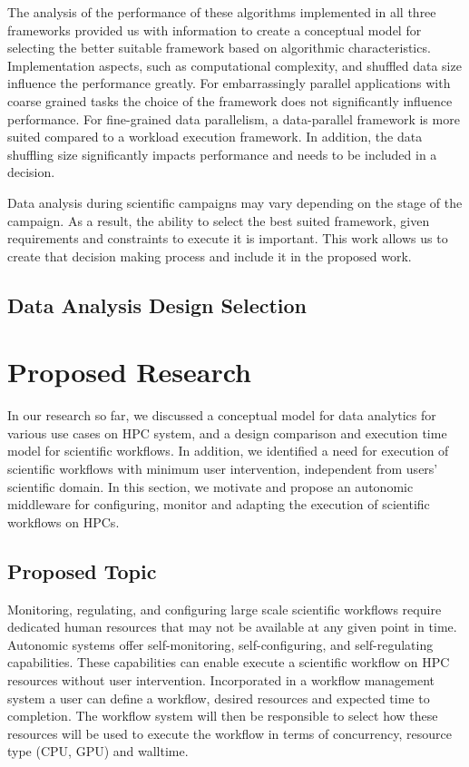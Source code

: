 The analysis of the performance of these algorithms implemented in all three 
frameworks provided us with information to create a conceptual model for selecting 
the better suitable framework based on algorithmic characteristics. Implementation 
aspects, such as computational complexity, and shuffled data size influence the 
performance greatly. For embarrassingly parallel applications with coarse grained 
tasks the choice of the framework does not significantly influence performance. 
For fine-grained data parallelism, a data-parallel framework is more suited compared 
to a workload execution framework. In addition, the data shuffling size significantly 
impacts performance and needs to be included in a decision.

Data analysis during scientific campaigns may vary depending on the stage of the 
campaign. As a result, the ability to select the best suited framework, given 
requirements and constraints to execute it is important. This work allows us to 
create that decision making process and include it in the proposed work.

\subsection{Data Analysis Design Selection}


\section{Proposed Research}

In our research so far, we discussed a conceptual model for data analytics for 
various use cases on HPC system, and a design comparison and execution time model 
for scientific workflows. In addition, we identified a need for execution of 
scientific workflows with minimum user intervention, independent from users' 
scientific domain. In this section, we motivate and propose an autonomic middleware 
for configuring, monitor and adapting the execution of scientific workflows on 
HPCs.

\subsection{Proposed Topic}
Monitoring, regulating, and configuring large scale scientific workflows require 
dedicated human resources that may not be available at any given point in time. 
Autonomic systems offer self-monitoring, self-configuring, and self-regulating 
capabilities. These capabilities can enable execute a scientific workflow on HPC 
resources without user intervention. Incorporated in a workflow management system 
a user can define a workflow, desired resources and expected time to completion. 
The workflow system will then be responsible to select how these resources will 
be used to execute the workflow in terms of concurrency, resource type (CPU, GPU) 
and walltime.


